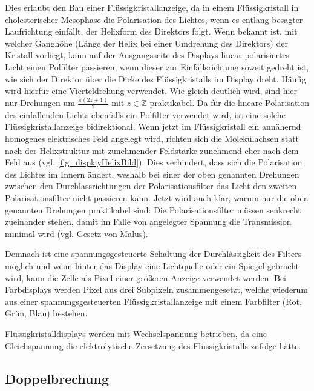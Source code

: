 \documentclass[
	a4paper,
	12pt,
	pagesize,
	ngerman
]{scrartcl}
\begin{document}
	Dies erlaubt den Bau einer Flüssigkristallanzeige, da in einem Flüssigkristall in cholesterischer Mesophase die Polarisation des Lichtes, wenn es entlang besagter Laufrichtung einfällt, der Helixform des Direktors folgt.
	Wenn bekannt ist, mit welcher Ganghöhe (Länge der Helix bei einer Umdrehung des Direktors) der Kristall vorliegt, kann auf der Ausgangsseite des Displays linear polarisiertes Licht einen Polfilter passieren, wenn dieser zur Einfallsrichtung soweit gedreht ist, wie sich der Direktor über die Dicke des Flüssigkristalls im Display dreht.
	Häufig wird hierfür eine Vierteldrehung verwendet. Wie gleich deutlich wird, sind hier nur Drehungen um $\frac{\pi (2z+1)}{2}$ mit $z \in \mathbb{Z}$ praktikabel.
	Da für die lineare Polarisation des einfallenden Lichts ebenfalls ein Polfilter verwendet wird, ist eine solche Flüssigkristallanzeige bidirektional.
	Wenn jetzt im Flüssigkristall ein annähernd homogenes elektrisches Feld angelegt wird, richten sich die Molekülachsen statt nach der Helixstruktur mit zunehmender Feldstärke zunehmend eher nach dem Feld aus (vgl. \cref{fig_displayHelixBild}). %
	Dies verhindert, dass sich die Polarisation des Lichtes im Innern ändert, weshalb bei einer der oben genannten Drehungen zwischen den Durchlassrichtungen der Polarisationsfilter das Licht den zweiten Polarisationsfilter nicht passieren kann.
	Jetzt wird auch klar, warum nur die oben genannten Drehungen praktikabel sind:
	Die Polarisationsfilter müssen senkrecht zueinander stehen, damit im Falle von angelegter Spannung die Transmission minimal wird (vgl. Gesetz von Malus).

	Demnach ist eine spannungsgesteuerte Schaltung der Durchlässigkeit des Filters möglich und wenn hinter das Display eine Lichtquelle oder ein Spiegel gebracht wird, kann die Zelle als Pixel einer größeren Anzeige verwendet werden.
	Bei Farbdisplays werden Pixel aus drei Subpixeln zusammengesetzt, welche wiederum aus einer spannungsgesteuerten Flüssigkristallanzeige mit einem Farbfilter (Rot, Grün, Blau) bestehen. %

	Flüssigkristalldisplays werden mit Wechselspannung betrieben, da eine Gleichspannung die elektrolytische Zersetzung des Flüssigkristalls zufolge hätte. %

\subsection{Doppelbrechung}
\end{document}
